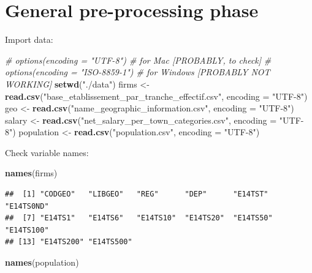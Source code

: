 \documentclass[]{article}
\newenvironment{Shaded}{\begin{snugshade}}{\end{snugshade}}
\newcommand{\KeywordTok}[1]{\textcolor[rgb]{0.13,0.29,0.53}{\textbf{#1}}}
\newcommand{\DataTypeTok}[1]{\textcolor[rgb]{0.13,0.29,0.53}{#1}}
\newcommand{\StringTok}[1]{\textcolor[rgb]{0.31,0.60,0.02}{#1}}
\newcommand{\CommentTok}[1]{\textcolor[rgb]{0.56,0.35,0.01}{\textit{#1}}}
\newcommand{\NormalTok}[1]{#1}
\begin{document}
\section{General pre-processing
phase}\label{general-pre-processing-phase}

Import data:

\begin{Shaded}
\begin{Highlighting}[]
\CommentTok{# options(encoding = "UTF-8")  # for Mac [PROBABLY, to check]}
\CommentTok{# options(encoding = "ISO-8859-1")  # for Windows [PROBABLY NOT WORKING]}
\KeywordTok{setwd}\NormalTok{(}\StringTok{"./data"}\NormalTok{)}
\NormalTok{firms       <-}\StringTok{ }\KeywordTok{read.csv}\NormalTok{(}\StringTok{"base_etablissement_par_tranche_effectif.csv"}\NormalTok{, }\DataTypeTok{encoding =} \StringTok{"UTF-8"}\NormalTok{)}
\NormalTok{geo         <-}\StringTok{ }\KeywordTok{read.csv}\NormalTok{(}\StringTok{"name_geographic_information.csv"}\NormalTok{, }\DataTypeTok{encoding =} \StringTok{"UTF-8"}\NormalTok{)}
\NormalTok{salary      <-}\StringTok{ }\KeywordTok{read.csv}\NormalTok{(}\StringTok{"net_salary_per_town_categories.csv"}\NormalTok{, }\DataTypeTok{encoding =} \StringTok{"UTF-8"}\NormalTok{)}
\NormalTok{population  <-}\StringTok{ }\KeywordTok{read.csv}\NormalTok{(}\StringTok{"population.csv"}\NormalTok{, }\DataTypeTok{encoding =} \StringTok{"UTF-8"}\NormalTok{)}
\end{Highlighting}
\end{Shaded}

Check variable names:

\begin{Shaded}
\begin{Highlighting}[]
\KeywordTok{names}\NormalTok{(firms) }
\end{Highlighting}
\end{Shaded}

\begin{verbatim}
##  [1] "CODGEO"   "LIBGEO"   "REG"      "DEP"      "E14TST"   "E14TS0ND"
##  [7] "E14TS1"   "E14TS6"   "E14TS10"  "E14TS20"  "E14TS50"  "E14TS100"
## [13] "E14TS200" "E14TS500"
\end{verbatim}

\begin{Shaded}
\begin{Highlighting}[]
\KeywordTok{names}\NormalTok{(population)}
\end{Highlighting}
\end{Shaded}
\end{document}
